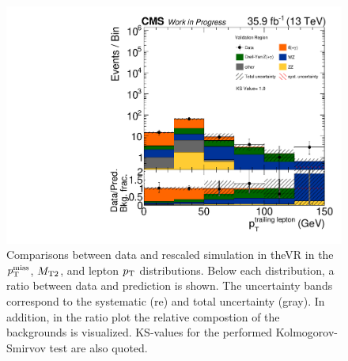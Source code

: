 \begin{figure}[tbp]
 \includegraphics[width=\pairwidth]{figures/plots_VR/VR_LL_pt2_log}
 \caption{Comparisons between data and rescaled simulation in theVR in the $p_{\mathrm{T}}^\text{miss}$, $M_{\mathrm{T2}}$, and lepton $p_{\mathrm{T}}$ distributions. Below each distribution, a ratio between data and prediction is shown. The uncertainty bands correspond to the systematic (re) and total uncertainty (gray). In addition, in the ratio plot the relative compostion of the backgrounds is visualized. KS-values for the performed Kolmogorov-Smirvov test are also quoted.}
 \label{fig:VR1}
\end{figure}



